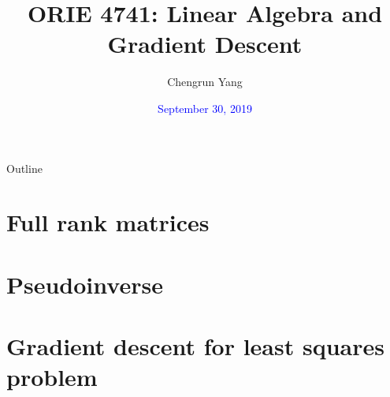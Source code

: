 \documentclass{beamer}
\title{ORIE 4741: Linear Algebra and Gradient Descent}
\date{\textcolor{blue}{September 30, 2019}}
\author{Chengrun Yang \\
	[1ex]
}
\begin{document}
\begin{frame}
\titlepage
\end{frame}


 \begin{frame}{Outline}
 \tableofcontents
 \end{frame}

\section{Full rank matrices}



\section{Pseudoinverse}


\section{Gradient descent for least squares problem}

\end{document}
